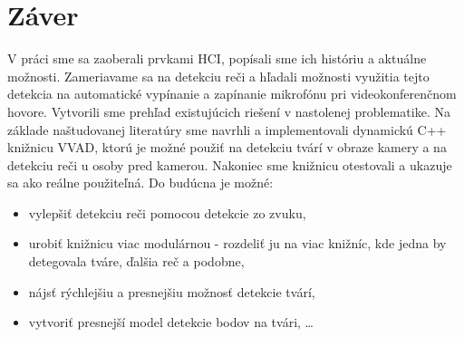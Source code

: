 \chapter*{Záver}
V práci sme sa zaoberali prvkami HCI, popísali sme ich históriu a aktuálne možnosti.
Zameriavame sa na detekciu reči a hľadali možnosti využitia tejto detekcia na automatické vypínanie a zapínanie mikrofónu pri videokonferenčnom hovore.
Vytvorili sme prehľad existujúcich riešení v nastolenej problematike.
Na základe naštudovanej literatúry sme navrhli a implementovali dynamickú C++ knižnicu VVAD, ktorú je možné použiť na detekciu tvárí v obraze kamery a na detekciu reči u osoby pred kamerou.
Nakoniec sme knižnicu otestovali a ukazuje sa ako reálne použiteľná. 
Do budúcna je možné:
\begin{itemize}
\item vylepšiť detekciu reči pomocou detekcie zo zvuku,
\item urobiť knižnicu viac modulárnou - rozdeliť ju na viac knižníc, kde jedna by detegovala tváre, ďalšia reč a podobne, 
\item nájsť rýchlejšiu a presnejšiu možnosť detekcie tvárí,
\item vytvoriť presnejší model detekcie bodov na tvári, \ldots
\end{itemize}